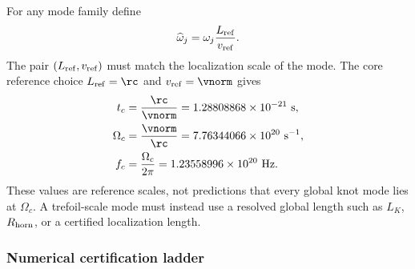         For any mode family define
        \begin{equation}
            \widehat\omega_j
            =
            \omega_j
            \frac{L_{\rm ref}}{v_{\rm ref}}.
            \label{eq:rt_qss_dimensionless_frequency}
        \end{equation}
        The pair \((L_{\rm ref},v_{\rm ref})\) must match the localization scale of the
        mode.  The core reference choice
        \(L_{\rm ref}=\rc\) and \(v_{\rm ref}=\vnorm\) gives
        \begin{align}
            t_c
            &=
            \frac{\rc}{\vnorm}
            =
            1.28808868\times10^{-21}\ \mathrm{s},
            \\
            \Omega_c
            &=
            \frac{\vnorm}{\rc}
            =
            7.76344066\times10^{20}\ \mathrm{s^{-1}},
            \\
            f_c
            &=
            \frac{\Omega_c}{2\pi}
            =
            1.23558996\times10^{20}\ \mathrm{Hz}.
            \label{eq:rt_qss_canonical_scales}
        \end{align}
        These values are reference scales, not predictions that every global knot mode
        lies at \(\Omega_c\).  A trefoil-scale mode must instead use a resolved global
        length such as \(L_K\), \(R_{\rm horn}\), or a certified localization length.

    \subsubsection*{Numerical certification ladder}


